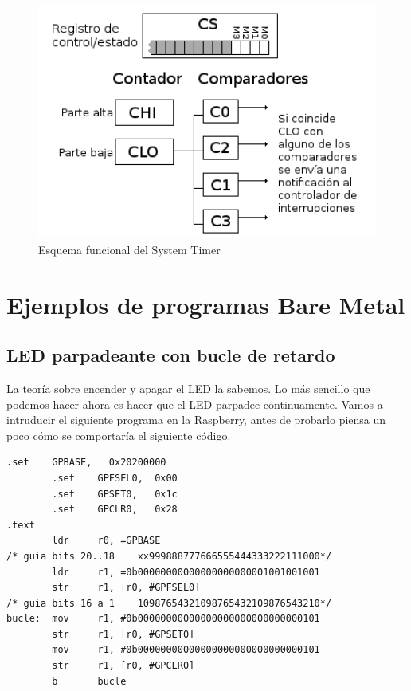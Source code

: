 \begin{figure}[h]
  \centering
    \includegraphics[width=14cm]{graphs/esquematimer.png}
  \caption{Esquema funcional del System Timer}
  \label{fig:esqtim}
\end{figure}


\section{Ejemplos de programas Bare Metal}

\subsection{LED parpadeante con bucle de retardo}

La teoría sobre encender y apagar el LED la sabemos. Lo más sencillo que podemos hacer ahora
es hacer que el LED parpadee continuamente. Vamos a intruducir el siguiente programa en la
Raspberry, antes de probarlo piensa un poco cómo se comportaría el siguiente código.

\begin{lstlisting}[caption={esbn3.s},label={lst:codigoPract4_3}]
        .set    GPBASE,   0x20200000
        .set    GPFSEL0,  0x00
        .set    GPSET0,   0x1c
        .set    GPCLR0,   0x28
.text
        ldr     r0, =GPBASE
/* guia bits 20..18    xx999888777666555444333222111000*/
        ldr     r1, =0b00000000000000000000001001001001
        str     r1, [r0, #GPFSEL0]
/* guia bits 16 a 1    10987654321098765432109876543210*/
bucle:  mov     r1, #0b00000000000000000000000000000101
        str     r1, [r0, #GPSET0]
        mov     r1, #0b00000000000000000000000000000101
        str     r1, [r0, #GPCLR0]
        b       bucle
\end{lstlisting}


